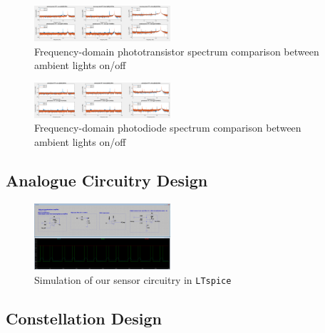 \documentclass[conference]{IEEEtran}
\begin{document}
\begin{figure}[H]
	\centerline{\includegraphics[width=0.45\textwidth]{sensor-phototransistor-sensitivity.png}}
	\caption{Frequency-domain phototransistor spectrum comparison between ambient lights on/off}
	\label{fig:sensor-phototransistor-sensitivity}
\end{figure}
\begin{figure}[H]
	\centerline{\includegraphics[width=0.45\textwidth]{sensor-photodiode-sensitivity.png}}
	\caption{Frequency-domain photodiode spectrum comparison between ambient lights on/off}
	\label{fig:sensor-photodiode-sensitivity}
\end{figure}

\subsection{Analogue Circuitry Design}

\begin{figure}[H]
	\centerline{\includegraphics[width=0.45\textwidth]{sensor-spice.png}}
	\caption{Simulation of our sensor circuitry in \texttt{LTspice}}
	\label{fig:sensor-spice}
\end{figure}

\subsection{Constellation Design}
\end{document}
